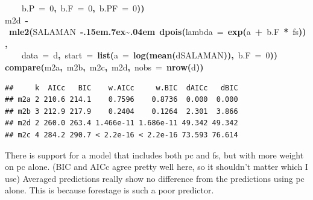 \documentclass{article}
\makeatletter
\newcommand{\hlnumber}[1]{\textcolor[rgb]{0,0,0}{#1}}%
\newcommand{\hlfunctioncall}[1]{\textcolor[rgb]{.5,0,.33}{\textbf{#1}}}%
\newcommand{\hlkeyword}[1]{\textbf{#1}}%
\newcommand{\hlargument}[1]{\textcolor[rgb]{.69,.25,.02}{#1}}%
\newcommand{\hlassignement}[1]{\textbf{#1}}%
\newcommand{\hlsymbol}[1]{#1}%
\def\urltilda{\kern -.15em\lower .7ex\hbox{\~{}}\kern .04em}%
\newcommand{\hlstd}[1]{\textcolor[rgb]{0,0,0}{#1}}%
\newenvironment{kframe}{%
 \def\FrameCommand##1{\hskip\@totalleftmargin \hskip-\fboxsep
 \colorbox{shadecolor}{##1}\hskip-\fboxsep
     \hskip-\linewidth \hskip-\@totalleftmargin \hskip\columnwidth}%
 \MakeFramed {\advance\hsize-\width
   \@totalleftmargin\z@ \linewidth\hsize
   \@setminipage}}%
 {\par\unskip\endMakeFramed}
\newenvironment{knitrout}{}{} %
\makeatother
\begin{document}
\begin{knitrout}
{\begin{kframe}
\begin{flushleft}
\hlstd{}{\ }{\ }{\ }{\ }\hlargument{b.P}{\ }\hlargument{=}{\ }\hlnumber{0}\hlkeyword{,}{\ }\hlargument{b.F}{\ }\hlargument{=}{\ }\hlnumber{0}\hlkeyword{,}{\ }\hlargument{b.PF}{\ }\hlargument{=}{\ }\hlnumber{0}\hlkeyword{)}\hlkeyword{)}\hspace*{\fill}\\
\hlstd{}\hlsymbol{m2d}{\ }\hlassignement{\usebox{\hlnormalsizeboxlessthan}-}{\ }\hlfunctioncall{mle2}\hlkeyword{(}\hlsymbol{SALAMAN}{\ }\hlkeyword{\urltilda{}}{\ }\hlfunctioncall{dpois}\hlkeyword{(}\hlargument{lambda}{\ }\hlargument{=}{\ }\hlfunctioncall{exp}\hlkeyword{(}\hlsymbol{a}{\ }\hlkeyword{+}{\ }\hlsymbol{b.F}{\ }\hlkeyword{*}{\ }\hlsymbol{fs}\hlkeyword{)}\hlkeyword{)}\hlkeyword{,}\hspace*{\fill}\\
\hlstd{}{\ }{\ }{\ }{\ }\hlargument{data}{\ }\hlargument{=}{\ }\hlsymbol{d}\hlkeyword{,}{\ }\hlargument{start}{\ }\hlargument{=}{\ }\hlfunctioncall{list}\hlkeyword{(}\hlargument{a}{\ }\hlargument{=}{\ }\hlfunctioncall{log}\hlkeyword{(}\hlfunctioncall{mean}\hlkeyword{(}\hlsymbol{d}\hlkeyword{\usebox{\hlnormalsizeboxdollar}}\hlsymbol{SALAMAN}\hlkeyword{)}\hlkeyword{)}\hlkeyword{,}{\ }\hlargument{b.F}{\ }\hlargument{=}{\ }\hlnumber{0}\hlkeyword{)}\hlkeyword{)}\hspace*{\fill}\\
\hlstd{}\hlfunctioncall{compare}\hlkeyword{(}\hlsymbol{m2a}\hlkeyword{,}{\ }\hlsymbol{m2b}\hlkeyword{,}{\ }\hlsymbol{m2c}\hlkeyword{,}{\ }\hlsymbol{m2d}\hlkeyword{,}{\ }\hlargument{nobs}{\ }\hlargument{=}{\ }\hlfunctioncall{nrow}\hlkeyword{(}\hlsymbol{d}\hlkeyword{)}\hlkeyword{)}\mbox{}
\normalfont
\end{flushleft}
\begin{verbatim}
##     k  AICc   BIC    w.AICc     w.BIC  dAICc   dBIC
## m2a 2 210.6 214.1    0.7596    0.8736  0.000  0.000
## m2b 3 212.9 217.9    0.2404    0.1264  2.301  3.866
## m2d 2 260.0 263.4 1.466e-11 1.686e-11 49.342 49.342
## m2c 4 284.2 290.7 < 2.2e-16 < 2.2e-16 73.593 76.614
\end{verbatim}
\end{kframe}}
\end{knitrout}


There is support for a model that includes both pc and fs, but with more weight on pc alone. 
(BIC and AICc agree pretty well here, so it shouldn't matter which I use)
Averaged predictions really show no difference from the predictions using pc alone. 
This is because forestage is such a poor predictor. 
\end{document}
